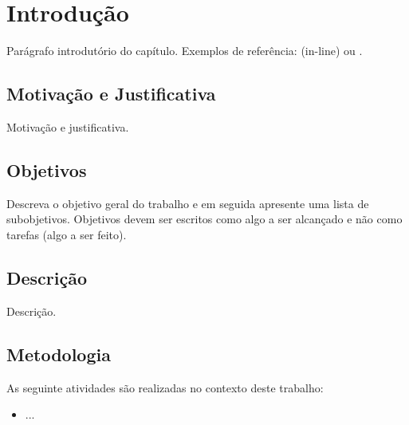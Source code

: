 
\section{Introdução}
\label{chap-intro}

Parágrafo introdutório do capítulo. Exemplos de referência:  (in-line) ou \cite{guarino-et-al:hobook09}.



\subsection{Motivação e Justificativa}
\label{sec-motivacao}

Motivação e justificativa.



\subsection{Objetivos}
\label{sec-objetivos}

Descreva o objetivo geral do trabalho e em seguida apresente uma lista de subobjetivos. Objetivos devem ser escritos como algo a ser alcançado e não como tarefas (algo a ser feito).



\subsection{Descrição}
\label{sec-descricao}

Descrição.



\subsection{Metodologia}
\label{sec-metodologia}

As seguinte atividades são realizadas no contexto deste trabalho:

\begin{itemize}
	\item ...
\end{itemize}



